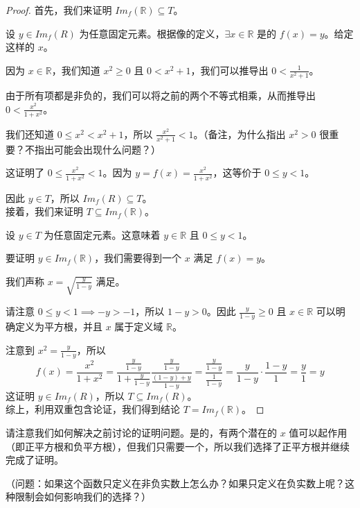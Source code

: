 \begin{example}
    \begin{proof}
        首先，我们来证明 $Im_f (\mathbb{R}) \subseteq T$。

        设 $y \in Im_f (R)$ 为任意固定元素。根据像的定义，$\exists x \in \mathbb{R}$ 是的 $f(x) = y$。给定这样的 $x$。

        因为 $x \in \mathbb{R}$，我们知道 $x^2 \ge 0$ 且 $0 < x^2+1$，我们可以推导出 $0 < \frac{1}{x^2+1}$。

        由于所有项都是非负的，我们可以将之前的两个不等式相乘，从而推导出 $0 < \frac{x^2}{1+x^2}$。

        我们还知道 $0 \le x^2 < x^2 + 1$，所以 $\frac{x^2}{x^2+1}<1$。（备注，为什么指出 $x^2>0$ 很重要？不指出可能会出现什么问题？）

        这证明了 $0 \le \frac{x^2}{1+x^2} < 1$。因为 $y = f(x) = \frac{x^2}{1+x^2}$，这等价于 $0 \le y < 1$。

        因此 $y \in T$，所以 $Im_f (R) \subseteq T$。\\

        接着，我们来证明 $T \subseteq Im_f (\mathbb{R})$。

        设 $y \in T$ 为任意固定元素。这意味着 $y \in \mathbb{R}$ 且 $0 \le y < 1$。

        要证明 $y \in Im_f (\mathbb{R})$，我们需要得到一个 $x$ 满足 $f(x) = y$。

        我们声称 $x = \sqrt{\frac{y}{1-y}}$ 满足。

        请注意 $0 \le y < 1 \implies -y > -1$，所以 $1-y > 0$。因此 $\frac{y}{1-y} \ge 0$ 且 $x \in \mathbb{R}$ 可以明确定义为平方根，并且 $x$ 属于定义域 $\mathbb{R}$。
        
        注意到 $x^2=\frac{y}{1-y}$，所以
        \[f(x) = \frac{x^2}{1+x^2} = \frac{\frac{y}{1-y}}{1+\frac{y}{1-y}}\frac{\frac{y}{1-y}}{\frac{(1-y)+y}{1-y}}=\frac{\frac{y}{1-y}}{\frac{1}{1-y}}=\frac{y}{1-y} \cdot \frac{1-y}{1} = \frac{y}{1} = y\]
        这证明 $y \in Im_f (R)$，所以 $T \subseteq Im_f (R)$。\\

        综上，利用双重包含论证，我们得到结论 $T = Im_f (\mathbb{R})$。
    \end{proof}
\end{example}

请注意我们如何解决之前讨论的证明问题。是的，有两个潜在的 $x$ 值可以起作用（即正平方根和负平方根），但我们只需要一个，所以我们选择了正平方根并继续完成了证明。

（问题：如果这个函数只定义在非负实数上怎么办？如果只定义在负实数上呢？这种限制会如何影响我们的选择？）\\

